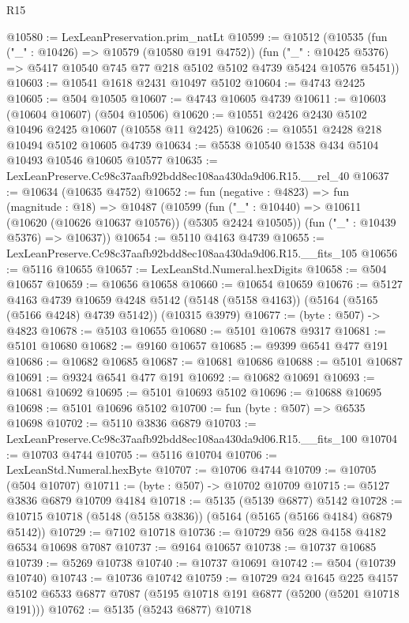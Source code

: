 \begin{lexlean}{R15}
\begin{coremodule}
{{{{{{{{{{{@10580 := LexLeanPreservation.prim_natLt
@10599 := @10512
    (@10535
      (fun ("_" : @10426) => @10579 (@10580 @191 @4752))
      (fun ("_" : @10425 @5376) => @5417 @10540 @745 @77 @218 @5102 @5102 @4739 @5424 @10576 @5451))
@10603 := @10541 @1618 @2431 @10497 @5102
@10604 := @4743 @2425
@10605 := @504 @10505
@10607 := @4743 @10605 @4739
@10611 := @10603 (@10604 @10607) (@504 @10506)
@10620 := @10551 @2426 @2430 @5102 @10496 @2425 @10607 (@10558 @11 @2425)
@10626 := @10551 @2428 @218 @10494 @5102 @10605 @4739
@10634 := @5538 @10540 @1538 @434 @5104 @10493 @10546 @10605 @10577
@10635 := LexLeanPreserve.Cc98c37aafb92bdd8ec108aa430da9d06.R15.__rel_40
@10637 := @10634 (@10635 @4752)
@10652 := fun (negative : @4823) =>
  fun (magnitude : @18) =>
  @10487
    (@10599
      (fun ("_" : @10440) => @10611 (@10620 (@10626 @10637 @10576)) (@5305 @2424 @10505))
      (fun ("_" : @10439 @5376) => @10637))
@10654 := @5110 @4163 @4739
@10655 := LexLeanPreserve.Cc98c37aafb92bdd8ec108aa430da9d06.R15.__fits_105
@10656 := @5116 @10655
@10657 := LexLeanStd.Numeral.hexDigits
@10658 := @504 @10657
@10659 := @10656 @10658
@10660 := @10654 @10659
@10676 := @5127
    @4163
    @4739
    @10659
    @4248
    @5142
    (@5148 (@5158 @4163))
    (@5164 (@5165 (@5166 @4248) @4739 @5142))
    (@10315 @3979)
@10677 := (byte : @507) -> @4823
@10678 := @5103 @10655
@10680 := @5101 @10678 @9317
@10681 := @5101 @10680
@10682 := @9160 @10657
@10685 := @9399 @6541 @477 @191
@10686 := @10682 @10685
@10687 := @10681 @10686
@10688 := @5101 @10687
@10691 := @9324 @6541 @477 @191
@10692 := @10682 @10691
@10693 := @10681 @10692
@10695 := @5101 @10693 @5102
@10696 := @10688 @10695
@10698 := @5101 @10696 @5102
@10700 := fun (byte : @507) => @6535 @10698
@10702 := @5110 @3836 @6879
@10703 := LexLeanPreserve.Cc98c37aafb92bdd8ec108aa430da9d06.R15.__fits_100
@10704 := @10703 @4744
@10705 := @5116 @10704
@10706 := LexLeanStd.Numeral.hexByte
@10707 := @10706 @4744
@10709 := @10705 (@504 @10707)
@10711 := (byte : @507) -> @10702 @10709
@10715 := @5127 @3836 @6879 @10709 @4184
@10718 := @5135 (@5139 @6877) @5142
@10728 := @10715 @10718 (@5148 (@5158 @3836)) (@5164 (@5165 (@5166 @4184) @6879 @5142))
@10729 := @7102 @10718
@10736 := @10729 @56 @28 @4158 @4182 @6534 @10698 @7087
@10737 := @9164 @10657
@10738 := @10737 @10685
@10739 := @5269 @10738
@10740 := @10737 @10691
@10742 := @504 (@10739 @10740)
@10743 := @10736 @10742
@10759 := @10729
    @24
    @1645
    @225
    @4157
    @5102
    @6533
    @6877
    @7087
    (@5195 @10718 @191 @6877 (@5200 (@5201 @10718 @191)))
@10762 := @5135 (@5243 @6877) @10718
}}}}}}}}}}}
\end{coremodule}
\end{lexlean}
